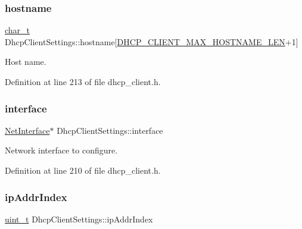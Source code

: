 \mbox{\label{structDhcpClientSettings_a06492a9a9fcc12e03b8c1acd2ba0d4c1}} 
\subsubsection{\texorpdfstring{hostname}{hostname}}
{\footnotesize\ttfamily \hyperlink{compiler__port_8h_a40bb5262bf908c328fbcfbe5d29d0201}{char\+\_\+t} Dhcp\+Client\+Settings\+::hostname\mbox{[}\hyperlink{dhcp__client_8h_a5ab1a0b3b4dcec70980a6fa93edd4d2d}{D\+H\+C\+P\+\_\+\+C\+L\+I\+E\+N\+T\+\_\+\+M\+A\+X\+\_\+\+H\+O\+S\+T\+N\+A\+M\+E\+\_\+\+L\+EN}+1\mbox{]}}



Host name. 



Definition at line 213 of file dhcp\+\_\+client.\+h.

\mbox{\label{structDhcpClientSettings_a7b79716b929228b11ee6baac5f80ebab}} 
\subsubsection{\texorpdfstring{interface}{interface}}
{\footnotesize\ttfamily \hyperlink{net_8h_a2234db8911a1148c9159979d8f5e0d6b}{Net\+Interface}$\ast$ Dhcp\+Client\+Settings\+::interface}



Network interface to configure. 



Definition at line 210 of file dhcp\+\_\+client.\+h.

\mbox{\label{structDhcpClientSettings_a8ff0d3572114fbb8aa51fdfeb5e949c5}} 
\subsubsection{\texorpdfstring{ip\+Addr\+Index}{ipAddrIndex}}
{\footnotesize\ttfamily \hyperlink{compiler__port_8h_a12a1e9b3ce141648783a82445d02b58d}{uint\+\_\+t} Dhcp\+Client\+Settings\+::ip\+Addr\+Index}



